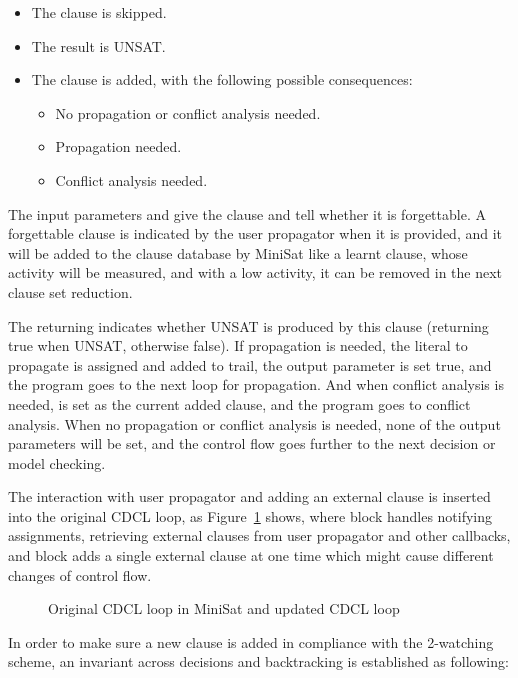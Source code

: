 \begin{itemize}
  \item The clause is skipped.
  \item The result is UNSAT.
  \item The clause is added, with the following possible consequences:
    \begin{itemize}
      \item No propagation or conflict analysis needed.
      \item Propagation needed.
      \item Conflict analysis needed.
    \end{itemize}
\end{itemize}

The input parameters  and  give the clause and tell whether it is forgettable. A forgettable clause is indicated by the user propagator when it is provided, and it will be added to the clause database by MiniSat like a learnt clause, whose activity will be measured, and with a low activity, it can be removed in the next clause set reduction.

The returning  indicates whether UNSAT is produced by this clause (returning true when UNSAT, otherwise false). If propagation is needed, the literal to propagate is assigned and added to trail, the output parameter  is set true, and the program goes to the next loop for propagation. And when conflict analysis is needed,  is set as the current added clause, and the program goes to conflict analysis. When no propagation or conflict analysis is needed, none of the output parameters will be set, and the control flow goes further to the next decision or model checking.

The interaction with user propagator and adding an external clause is inserted into the original CDCL loop, as Figure~\ref{fig:flow} shows, where  block handles notifying assignments, retrieving external clauses from user propagator and other callbacks, and  block adds a single external clause at one time which might cause different changes of control flow.

\begin{figure}[!htbp]
  \centering
  
  \caption{Original CDCL loop in MiniSat and updated CDCL loop}
  \label{fig:flow}
\end{figure}

In order to make sure a new clause is added in compliance with the 2-watching scheme, an invariant across decisions and backtracking is established as following:


